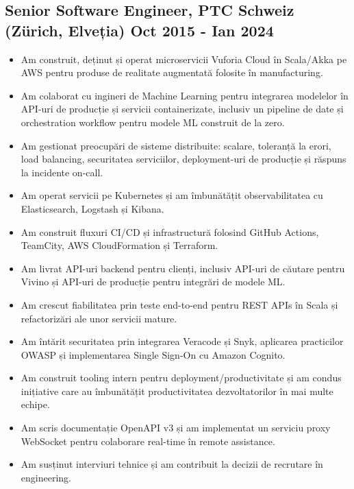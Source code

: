 \documentclass[11pt,a4paper]{article}
\begin{document}
\subsection*{Senior Software Engineer, PTC Schweiz (Zürich, Elveția) \hfill Oct 2015 - Ian 2024}
\begin{itemize}
  \item Am construit, deținut și operat microservicii Vuforia Cloud în Scala/Akka pe AWS pentru produse de realitate augmentată folosite în manufacturing.
  \item Am colaborat cu ingineri de Machine Learning pentru integrarea modelelor în API-uri de producție și servicii containerizate, inclusiv un pipeline de date și orchestration workflow pentru modele ML construit de la zero.
  \item Am gestionat preocupări de sisteme distribuite: scalare, toleranță la erori, load balancing, securitatea serviciilor, deployment-uri de producție și răspuns la incidente on-call.
  \item Am operat servicii pe Kubernetes și am îmbunătățit observabilitatea cu Elasticsearch, Logstash și Kibana.
  \item Am construit fluxuri CI/CD și infrastructură folosind GitHub Actions, TeamCity, AWS CloudFormation și Terraform.
  \item Am livrat API-uri backend pentru clienți, inclusiv API-uri de căutare pentru Vivino și API-uri de producție pentru integrări de modele ML.
  \item Am crescut fiabilitatea prin teste end-to-end pentru REST APIs în Scala și refactorizări ale unor servicii mature.
  \item Am întărit securitatea prin integrarea Veracode și Snyk, aplicarea practicilor OWASP și implementarea Single Sign-On cu Amazon Cognito.
  \item Am construit tooling intern pentru deployment/productivitate și am condus inițiative care au îmbunătățit productivitatea dezvoltatorilor în mai multe echipe.
  \item Am scris documentație OpenAPI v3 și am implementat un serviciu proxy WebSocket pentru colaborare real-time în remote assistance.
  \item Am susținut interviuri tehnice și am contribuit la decizii de recrutare în engineering.
\end{itemize}
\end{document}

